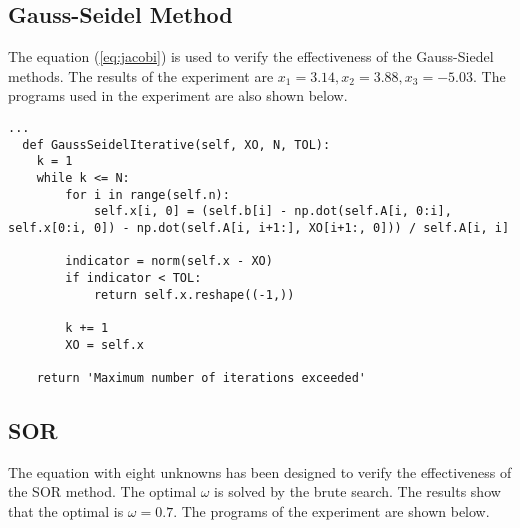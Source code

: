 \documentclass[preprint,12pt]{elsarticle}
\begin{document}
\subsection{Gauss-Seidel Method}
\label{SS:3.2}

The equation (\ref{eq:jacobi}) is used to verify the effectiveness of the Gauss-Siedel methods. The results of the experiment are $x_1 = 3.14, x_2 = 3.88, x_3 = -5.03$. The programs used in the experiment are also shown below.

\begin{lstlisting}
...
  def GaussSeidelIterative(self, XO, N, TOL):
    k = 1
    while k <= N:
        for i in range(self.n):
            self.x[i, 0] = (self.b[i] - np.dot(self.A[i, 0:i], self.x[0:i, 0]) - np.dot(self.A[i, i+1:], XO[i+1:, 0])) / self.A[i, i]
        
        indicator = norm(self.x - XO)
        if indicator < TOL:
            return self.x.reshape((-1,))
        
        k += 1
        XO = self.x
    
    return 'Maximum number of iterations exceeded'
\end{lstlisting}

\subsection{SOR}
\label{SS:3.3}

The equation with eight unknowns has been designed to verify the effectiveness of the SOR method. The optimal $\omega$ is solved by the brute search. The results show that the optimal is $\omega = 0.7$. The programs of the experiment are shown below.
\end{document}
